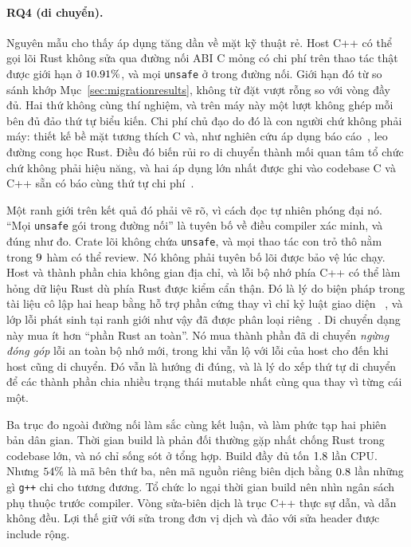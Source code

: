 \paragraph{RQ4 (di chuyển).} Nguyên mẫu cho thấy áp dụng tăng dần về mặt kỹ thuật
rẻ. Host C++ có thể gọi lõi Rust không sửa qua đường nối ABI C mỏng có chi phí trên
thao tác thật được giới hạn ở $10.91\%$, và mọi \texttt{unsafe} ở trong đường nối.
Giới hạn đó từ so sánh khớp Mục~\ref{sec:migrationresults}, không
từ đặt vượt rỗng
so với vòng đầy đủ. Hai thứ không cùng thí nghiệm, và trên máy này một
lượt không ghép mỗi bên đủ đảo thứ tự biểu kiến. Chi phí chủ đạo do đó
là con người chứ không phải máy: thiết kế bề mặt tương thích C và, như nghiên cứu áp dụng
báo cáo~\cite{fulton2021adopting,crichton2024learning}, leo đường cong học Rust.
Điều đó biến rủi ro di chuyển thành mối quan tâm tổ chức chứ không phải hiệu năng, và hai
áp dụng lớn nhất được ghi vào codebase C và C++ sẵn có báo cùng thứ tự
chi phí~\cite{li2026rustlinux,fan2026android}.

Một ranh giới trên kết quả đó phải vẽ rõ, vì cách đọc tự nhiên phóng đại
nó. ``Mọi \texttt{unsafe} gói trong đường nối'' là tuyên bố về điều compiler xác minh,
và đúng như đo. Crate lõi không chứa \texttt{unsafe}, và mọi thao tác con trỏ thô
nằm trong $9$ hàm có thể review. Nó không phải tuyên bố lõi được bảo vệ lúc chạy.
Host và thành phần chia không gian địa chỉ, và lỗi bộ nhớ phía C++ có thể làm hỏng
dữ liệu Rust dù phía Rust được kiểm cẩn thận. Đó là lý do biện pháp trong
tài liệu cô lập hai heap bằng hỗ trợ phần cứng thay vì chỉ kỷ luật giao diện
~\cite{rivera2021galeed,kirth2022pkrusafe}, và lớp lỗi phát sinh tại ranh giới như vậy
đã được phân loại riêng~\cite{li2022crosslang}. Di chuyển
dạng này mua ít hơn ``phần Rust an toàn''. Nó mua thành phần đã di chuyển
\emph{ngừng đóng góp} lỗi an toàn bộ nhớ mới, trong khi vẫn lộ với lỗi
của host cho đến khi host cũng di chuyển. Đó vẫn là hướng đi đúng, và
là lý do xếp thứ tự di chuyển để các thành phần chia nhiều trạng thái mutable nhất
cùng qua thay vì từng cái một.

Ba trục đo ngoài đường nối làm sắc cùng kết luận, và làm phức tạp hai phiên bản
dân gian. Thời gian build là phản đối thường gặp nhất chống Rust trong codebase lớn, và
nó chỉ sống sót ở tổng hợp. Build đầy đủ tốn $1.8$ lần CPU. Nhưng
$54\%$ là mã bên thứ ba, nên mã nguồn riêng biên dịch bằng
$0.8$ lần những gì \texttt{g++} chi cho tương đương. Tổ chức
lo ngại thời gian build nên nhìn ngân sách phụ thuộc trước compiler. Vòng sửa-biên dịch là trục C++ thực sự dẫn, và dẫn không đều. Lợi thế
giữ với sửa trong đơn vị dịch và đảo với sửa header được include rộng.

